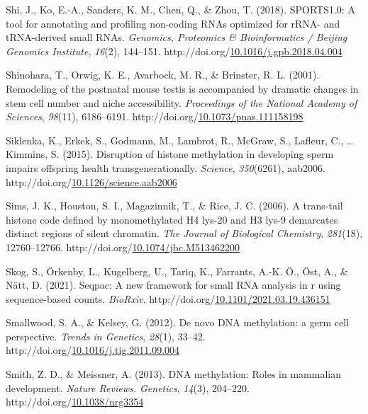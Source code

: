 \documentclass[12pt,twoside]{reedthesis}
\newlength{\cslhangindent}
\newenvironment{CSLReferences}[2] %
 {%
  \setlength{\parindent}{0pt}
  \ifodd #1 \everypar{\setlength{\hangindent}{\cslhangindent}}\ignorespaces\fi
  \ifnum #2 > 0
  \setlength{\parskip}{#2\baselineskip}
  \fi
 }%
 {}
\begin{document}
\begin{CSLReferences}{1}{0}
\leavevmode{}%
Shi, J., Ko, E.-A., Sanders, K. M., Chen, Q., \& Zhou, T. (2018). SPORTS1.0: A tool for annotating and profiling non-coding RNAs optimized for rRNA- and tRNA-derived small RNAs. \emph{Genomics, Proteomics \& Bioinformatics / Beijing Genomics Institute}, \emph{16}(2), 144--151. http://doi.org/\href{https://doi.org/10.1016/j.gpb.2018.04.004}{10.1016/j.gpb.2018.04.004}

\leavevmode{}%
Shinohara, T., Orwig, K. E., Avarbock, M. R., \& Brinster, R. L. (2001). Remodeling of the postnatal mouse testis is accompanied by dramatic changes in stem cell number and niche accessibility. \emph{Proceedings of the National Academy of Sciences}, \emph{98}(11), 6186--6191. http://doi.org/\href{https://doi.org/10.1073/pnas.111158198}{10.1073/pnas.111158198}

\leavevmode{}%
Siklenka, K., Erkek, S., Godmann, M., Lambrot, R., McGraw, S., Lafleur, C., \ldots{} Kimmins, S. (2015). Disruption of histone methylation in developing sperm impairs offspring health transgenerationally. \emph{Science}, \emph{350}(6261), aab2006. http://doi.org/\href{https://doi.org/10.1126/science.aab2006}{10.1126/science.aab2006}

\leavevmode{}%
Sims, J. K., Houston, S. I., Magazinnik, T., \& Rice, J. C. (2006). A trans-tail histone code defined by monomethylated H4 lys-20 and H3 lys-9 demarcates distinct regions of silent chromatin. \emph{The Journal of Biological Chemistry}, \emph{281}(18), 12760--12766. http://doi.org/\href{https://doi.org/10.1074/jbc.M513462200}{10.1074/jbc.M513462200}

\leavevmode{}%
Skog, S., Örkenby, L., Kugelberg, U., Tariq, K., Farrants, A.-K. Ö., Öst, A., \& Nätt, D. (2021). Seqpac: A new framework for small RNA analysis in r using sequence-based counts. \emph{BioRxiv}. http://doi.org/\href{https://doi.org/10.1101/2021.03.19.436151}{10.1101/2021.03.19.436151}

\leavevmode{}%
Smallwood, S. A., \& Kelsey, G. (2012). De novo DNA methylation: a germ cell perspective. \emph{Trends in Genetics}, \emph{28}(1), 33--42. http://doi.org/\href{https://doi.org/10.1016/j.tig.2011.09.004}{10.1016/j.tig.2011.09.004}

\leavevmode{}%
Smith, Z. D., \& Meissner, A. (2013). DNA methylation: Roles in mammalian development. \emph{Nature Reviews. Genetics}, \emph{14}(3), 204--220. http://doi.org/\href{https://doi.org/10.1038/nrg3354}{10.1038/nrg3354}


\end{CSLReferences}
\end{document}
